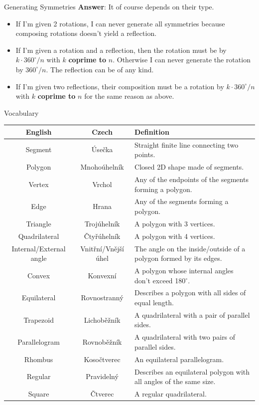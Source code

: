 \documentclass[final]{beamer}
\newlength{\colwidth}
\begin{document}
\begin{frame}[t]
\begin{columns}[t]
\begin{column}{\colwidth}
\begin{block}{Generating Symmetries}
  \textbf{Answer}: It of course depends on their type.
  \begin{itemize}[label=\textcolor{gevodarkblue}{\textbullet},leftmargin=3ex]
   \item If I'm given 2 rotations, I can never generate all symmetries because
    composing rotations doesn't yield a reflection.
   \item If I'm given a rotation and a reflection, then the rotation must be by
    $k \cdot 360^{ \circ } / n$ with $k$ \textbf{coprime to} $n$. Otherwise I can
    never generate the rotation by $360^{ \circ } / n$. The reflection can be of
    any kind.
   \item If I'm given two reflections, their composition must be a rotation by $k
    \cdot 360^{ \circ } / n$ with $k$ \textbf{coprime to} $n$ for the same reason
    as above.
  \end{itemize}
 \end{block}

 \begin{block}{Vocabulary}
   \begin{center}
   {\def\arraystretch{1.2}\tabcolsep=10pt
    \begin{tabular}{c | c | p{}}
     \textbf{English} & \textbf{Czech} & \textbf{Definition}\\
     \toprule
     Segment & Úsečka & Straight finite line connecting two points.\\
     Polygon & Mnohoúhelník & Closed 2D shape made of segments.\\
     Vertex & Vrchol & Any of the endpoints of the segments forming a polygon.\\
     Edge & Hrana & Any of the segments forming a polygon.\\
     Triangle & Trojúhelník & A polygon with 3 vertices.\\
     Quadrilateral & Čtyřúhelník & A polygon with 4 vertices.\\
     Internal/External angle & Vnitřní/Vnější úhel & The angle on the
     inside/outside of a polygon formed by its edges.\\
     Convex & Konvexní & A polygon whose internal angles don't exceed 180$^{
     \circ }$.\\
     Equilateral & Rovnostranný & Describes a polygon with all sides of equal
     length.\\
     Trapezoid & Lichoběžník & A quadrilateral with a pair of parallel sides.\\
     Parallelogram & Rovnoběžník & A quadrilateral with two pairs of parallel
     sides.\\
     Rhombus & Kosočtverec & An equilateral parallelogram.\\
     Regular & Pravidelný & Describes an equilateral polygon with all angles of
     the same size.\\
     Square & Čtverec & A regular quadrilateral.
    \end{tabular}
   }
   \end{center}
 \end{block}


\end{column}
\end{columns}
\end{frame}
\end{document}
